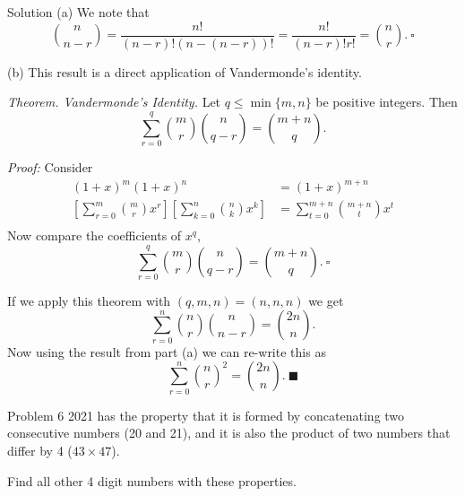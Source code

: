 \documentclass{article}
\begin{document}
\begin{solution}{Solution}
(a) We note that
$$
\binom{n}{n-r} = \frac{n!}{(n-r)!(n - (n-r))!} = \frac{n!}{(n-r)!r!} =
\binom{n}{r}. \ \square
$$

(b) This result is a direct application of Vandermonde's identity.
\vspace{0.2cm}

\textit{Theorem. Vandermonde's Identity.} Let $q \leq \min\{m, n\}$ be
positive integers. Then
$$
\sum_{r=0}^{q} \binom{m}{r} \binom{n}{q-r} = \binom{m+n}{q}.
$$

\textit{Proof:} Consider
\[
\begin{aligned}
(1+x)^m (1+x)^n &= (1+x)^{m+n} \\
\left[ \sum_{r=0}^m \binom{m}{r} x^r \right]
\left[ \sum_{k=0}^n \binom{n}{k} x^k \right] &=
\sum_{t=0}^{m+n}\binom{m+n}{t} x^t\\
\end{aligned}
\]
Now compare the coefficients of $x^q$,
$$
\sum_{r=0}^q \binom{m}{r} \binom{n}{q-r} = \binom{m + n}{q}. \ \square
$$

If we apply this theorem with $(q,m,n) = (n, n, n)$ we get
$$
\sum_{r=0}^n \binom{n}{r}\binom{n}{n-r} = \binom{2n}{n}.
$$
Now using the result from part (a) we can re-write this as
$$
\sum_{r=0}^n \binom{n}{r}^2 = \binom{2n}{n}. \ \blacksquare
$$
\end{solution}
\newpage

\begin{problem}{Problem 6}
2021 has the property that it is formed by concatenating two consecutive
numbers (20 and 21), and it is also the product of two numbers that differ
by 4 ($43 \times 47$).
\vspace{0.2cm}

Find all other 4 digit numbers with these properties.
\end{problem}
\end{document}
